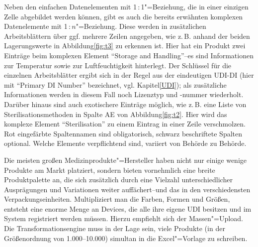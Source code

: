 Neben den einfachen Datenelementen mit 1\,:\,1"=Beziehung, die in einer einzigen Zelle abgebildet werden können, gibt es auch die bereits erwähnten komplexen Datenelemente mit 1\,:\,$n$"=Beziehung. Diese werden in zusätzlichen Arbeitsblättern über ggf. mehrere Zeilen angegeben, wie z.\,B. anhand der beiden Lagerungswerte in Abbildung\nbs\ref{fig:t3} zu erkennen ist. Hier hat ein Produkt zwei Einträge beim komplexen Element "`Storage and Handling"'\nbs --\nbs es sind Informationen zur Temperatur sowie zur Luftfeuchtigkeit hinterlegt. Der Schlüssel für die einzelnen Arbeitsblätter ergibt sich in der Regel aus der eindeutigen UDI-DI (hier mit "`Primary DI Number"' bezeichnet, vgl. Kapitel\nbs\ref{UDI}); als zusätzliche Informationen werden in diesem Fall noch Lizenztyp und -nummer wiederholt. Darüber hinaus sind auch exotischere Einträge möglich, wie z.\,B. eine Liste von Sterilisationsmethoden in Spalte AE von Abbildung\nbs\ref{fig:t2}. Hier wird das komplexe Element "`Sterilisation"' zu einem Eintrag in einer Zeile verschmolzen.\\
Rot eingefärbte Spaltennamen sind obligatorisch, schwarz beschriftete Spalten optional. Welche Elemente verpflichtend sind, variiert von Behörde zu Behörde.

Die meisten großen Medizinprodukte"=Hersteller haben nicht nur einige wenige Produkte am Markt platziert, sondern bieten vornehmlich eine breite Produktpalette an, die sich zusätzlich durch eine Vielzahl unterschiedlicher Ausprägungen und Variationen weiter auffächert\nbs --\nbs und das in den verschiedensten Verpackungseinheiten. Multipliziert man die Farben, Formen und Größen, entsteht eine enorme Menge an Devices, die alle ihre eigene UDI besitzen und im System registriert werden müssen. Hierzu empfiehlt sich der Massen"=Upload. Die Transformationsengine muss in der Lage sein, viele Produkte (in der Größenordnung von 1.000--10.000) simultan in die Excel"=Vorlage zu schreiben.

